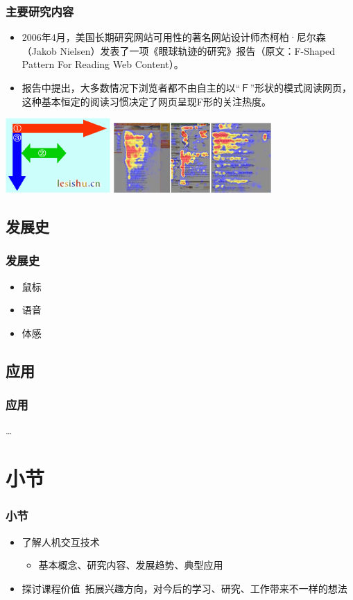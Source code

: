 \documentclass{beamer}
\begin{document}
\begin{frame}
	\frametitle{主要研究内容}
	\begin{itemize}
		\item 2006年4月，美国长期研究网站可用性的著名网站设计师杰柯柏·尼尔森（Jakob Nielsen）发表了一项《眼球轨迹的研究》报告（原文：F-Shaped Pattern For Reading Web Content）。 
		\item 报告中提出，大多数情况下浏览者都不由自主的以“Ｆ”形状的模式阅读网页，这种基本恒定的阅读习惯决定了网页呈现F形的关注热度。 
	\end{itemize}
	\begin{center}
		\includegraphics[width=4cm]{images/F-Shaped1.png}
		\includegraphics[width=6cm]{images/F-Shaped2.jpg}
	\end{center}
\end{frame}

\subsection{发展史}
\begin{frame}
	\frametitle{发展史}
	\begin{itemize}
		\item 鼠标
		\item 语音
		\item 体感
	\end{itemize}
\end{frame}

\subsection{应用}
\begin{frame}
	\frametitle{应用}
	\dots
\end{frame}

\section{小节}
\begin{frame}
	\frametitle{小节}
	\begin{itemize}
		\item 了解人机交互技术
		\begin{itemize}
			\item {\small 基本概念、研究内容、发展趋势、典型应用}
		\end{itemize}
		\item 探讨课程价值~{\tiny 拓展兴趣方向，对今后的学习、研究、工作带来不一样的想法}
	\end{itemize}
\end{frame}



\end{document}
